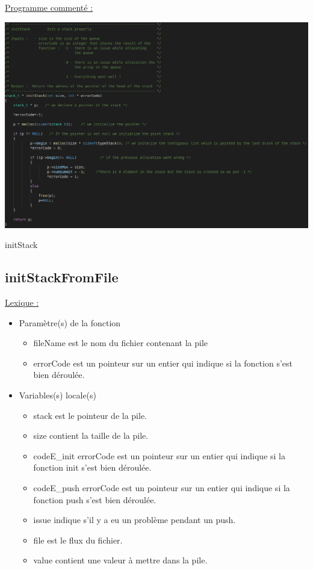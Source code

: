\documentclass[a4paper]{article}
\begin{document}
\underline{Programme commenté :}
\begin{center}
\includegraphics[scale=0.4]{initStack.png}

initStack
\end{center}
\subsection{initStackFromFile}
\underline{Lexique :}

\begin{itemize}

\item Paramètre(s) de la fonction  

\begin{itemize}

\item fileName est le nom du fichier contenant la pile
\item errorCode est un pointeur sur un entier qui indique si la fonction s'est bien déroulée.

\end{itemize}
\item Variables(s) locale(s)

\begin{itemize}

\item stack est le pointeur de la pile.
\item size contient la taille de la pile.
\item codeE\_init errorCode est un pointeur sur un entier qui indique si la fonction init s'est bien déroulée.
\item codeE\_push errorCode est un pointeur sur un entier qui indique si la fonction push s'est bien déroulée.
\item issue indique s'il y a eu un problème pendant un push.
\item file est le flux du fichier.
\item value contient une valeur à mettre dans la pile.

\end{itemize}
\end{itemize}
\end{document}
